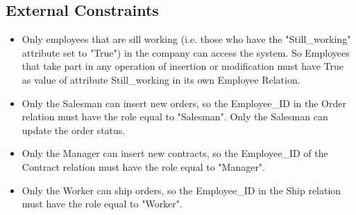 \subsection{External Constraints}
\begin{itemize}
\item Only employees that are sill working (i.e. those who have the "Still\_working" attribute set to "True") in the company can access the system. So Employees that take part in any operation of insertion or modification must have True as value of attribute Still\_working in its own Employee Relation.
\item Only the Salesman can insert new orders, so the Employee\_ID in the Order relation must have the role equal to "Salesman". Only the Salesman can update the order status.
\item Only the Manager can insert new contracts, so the Employee\_ID of the Contract relation must have the role equal to "Manager".
\item Only the Worker can ship orders, so the Employee\_ID in the Ship relation must have the role equal to "Worker".
\end{itemize}